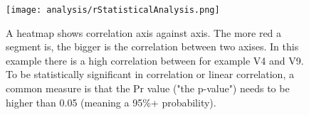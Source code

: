 




\begin{figure}[h]
    \centering
    \texttt{[image: analysis/rStatisticalAnalysis.png]}
    \caption{A heatmap shows correlation  axis against axis. The more red a segment is, the bigger is the correlation between two axises. In this example there is a high correlation between for example V4 and V9. To be statistically significant in correlation or linear correlation, a common measure is that the Pr value ("the p-value") needs to be higher than 0.05 (meaning a 95\%+ probability).}
    \label{fig:corrHeatmap}
\end{figure}

\clearpage




